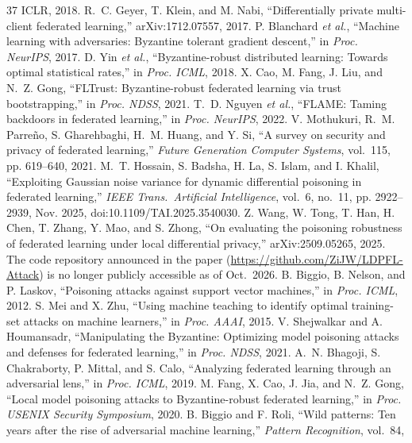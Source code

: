 \documentclass[final,1p,times]{elsarticle}
\newcommand{\etal}{\emph{et al.}}
\begin{document}
\begin{thebibliography}{37}
{ICLR}, 2018.
R.~C. Geyer, T. Klein, and M. Nabi, ``Differentially private
multi-client federated learning,'' arXiv:1712.07557, 2017.
P. Blanchard \etal, ``Machine learning with adversaries: Byzantine
tolerant gradient descent,'' in \emph{Proc. NeurIPS}, 2017.
D. Yin \etal, ``Byzantine-robust distributed learning: Towards optimal
statistical rates,'' in \emph{Proc. ICML}, 2018.
X. Cao, M. Fang, J. Liu, and N.~Z. Gong, ``FLTrust: Byzantine-robust
federated learning via trust bootstrapping,'' in \emph{Proc. NDSS},
2021.
T.~D. Nguyen \etal, ``FLAME: Taming backdoors in federated learning,''
in \emph{Proc. NeurIPS}, 2022.
V. Mothukuri, R.~M. Parre\~no, S. Gharehbaghi, H.~M. Huang, and Y. Si,
``A survey on security and privacy of federated learning,'' \emph{Future
Generation Computer Systems}, vol.~115, pp. 619--640, 2021.
M.~T. Hossain, S. Badsha, H. La, S. Islam, and I. Khalil, ``Exploiting
Gaussian noise variance for dynamic differential poisoning in federated
learning,'' \emph{IEEE Trans.\ Artificial Intelligence}, vol.~6, no.~11,
pp. 2922--2939, Nov. 2025, doi:10.1109/TAI.2025.3540030.
Z. Wang, W. Tong, T. Han, H. Chen, T. Zhang, Y. Mao, and S. Zhong, ``On
evaluating the poisoning robustness of federated learning under local
differential privacy,'' arXiv:2509.05265, 2025. The code repository
announced in the paper (\url{https://github.com/ZiJW/LDPFL-Attack}) is
no longer publicly accessible as of Oct.\ 2026.
B. Biggio, B. Nelson, and P. Laskov, ``Poisoning attacks against
support vector machines,'' in \emph{Proc. ICML}, 2012.
S. Mei and X. Zhu, ``Using machine teaching to identify optimal
training-set attacks on machine learners,'' in \emph{Proc. AAAI}, 2015.
V. Shejwalkar and A. Houmansadr, ``Manipulating the Byzantine: Optimizing
model poisoning attacks and defenses for federated learning,'' in
\emph{Proc. NDSS}, 2021.
A.~N. Bhagoji, S. Chakraborty, P. Mittal, and S. Calo, ``Analyzing
federated learning through an adversarial lens,'' in \emph{Proc. ICML},
2019.
M. Fang, X. Cao, J. Jia, and N.~Z. Gong, ``Local model poisoning attacks
to Byzantine-robust federated learning,'' in \emph{Proc. USENIX Security
Symposium}, 2020.
B. Biggio and F. Roli, ``Wild patterns: Ten years after the rise of
adversarial machine learning,'' \emph{Pattern Recognition}, vol.~84,

\end{thebibliography}
\end{document}
